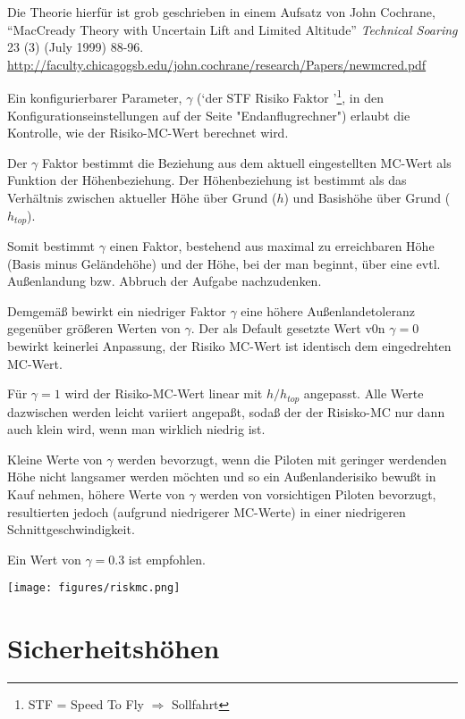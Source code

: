 Die Theorie hierfür ist grob geschrieben in einem Aufsatz von John
  Cochrane, ``MacCready Theory with Uncertain Lift and Limited
  Altitude'' {\em Technical Soaring} 23 (3) (July 1999) 88-96.
  \url{http://faculty.chicagogsb.edu/john.cochrane/research/Papers/newmcred.pdf}

Ein konfigurierbarer Parameter, $\gamma$ (`der STF Risiko Faktor '\footnote{STF  = Speed To Fly $\Rightarrow$  Sollfahrt},
in den Konfigurationseinstellungen auf der Seite "Endanflugrechner") erlaubt die Kontrolle, wie der Risiko-MC-Wert berechnet wird.

Der $\gamma$ Faktor bestimmt die Beziehung aus dem aktuell eingestellten MC-Wert als Funktion der Höhenbeziehung.
Der Höhenbeziehung ist bestimmt als das Verhältnis zwischen aktueller Höhe über Grund ($h$) und Basishöhe über Grund ($h_{top}$).

Somit bestimmt $\gamma$ einen Faktor, bestehend aus maximal zu erreichbaren Höhe (Basis minus Geländehöhe)
und der Höhe, bei der man beginnt, über eine evtl. Außenlandung bzw. Abbruch der Aufgabe nachzudenken.

Demgemäß bewirkt ein niedriger Faktor $\gamma$ eine höhere Außenlandetoleranz gegenüber größeren Werten von $\gamma$. Der als Default
gesetzte Wert v0n $\gamma=0$ bewirkt keinerlei  Anpassung, der Risiko MC-Wert ist identisch dem eingedrehten MC-Wert.

Für $\gamma=1$ wird der Risiko-MC-Wert linear mit $h/h_{top}$ angepasst.
Alle Werte dazwischen werden leicht variiert angepaßt, sodaß der der Risisko-MC nur dann auch klein wird, wenn man wirklich niedrig ist.

Kleine Werte von $\gamma$ werden bevorzugt, wenn die Piloten mit geringer werdenden Höhe nicht langsamer werden möchten und so ein
Außenlanderisiko bewußt in Kauf nehmen, höhere Werte von $\gamma$ werden von vorsichtigen Piloten bevorzugt,
resultierten jedoch (aufgrund niedrigerer MC-Werte) in einer niedrigeren Schnittgeschwindigkeit.

Ein Wert von  $\gamma=0.3$ ist empfohlen.

\begin{center}
\texttt{[image: figures/riskmc.png]}
\end{center}

\section{Sicherheitshöhen}\label{sec:safety-heights}

